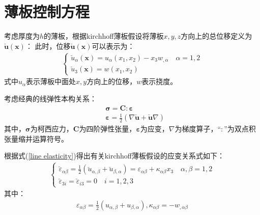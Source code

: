 \documentclass[engineeringmaster]{hquThesis}
\begin{document}
\section{薄板控制方程}
考虑厚度为$h$的薄板，根据kirchhoff薄板假设将薄板$x,y,z$方向上的总位移定义为$\breve{\pmb{u}}(\pmb{x})$：
此时，位移$\breve{\pmb{u}}(\pmb{x})$可以表示为：
\begin{equation}
    \begin{split}
    \begin{cases}
        \breve{u}_{\alpha}(\pmb{x})=u_{\alpha}(x_1,x_2)-x_3w_{,\alpha}\quad \alpha=1,2\\
        \breve{u}_3(\pmb{x})=w(x_1,x_2)
    \end{cases}
    \end{split}
    \end{equation}
式中$u_{\alpha}$表示薄板中面处$x,y$方向上的位移，$w$表示挠度。\par
考虑经典的线弹性本构关系：
\begin{equation}\label{line elasticity}
\begin{split}
    &\pmb{\sigma}=\pmb{C}\pmb{:}\pmb{\varepsilon}\\
    &\pmb{\varepsilon}=\frac{1}{2}(\nabla\breve{\pmb{u}}+\breve{\pmb{u}}\nabla)
\end{split}
\end{equation}
其中，$\pmb{\sigma}$为柯西应力，$\pmb{C}$为四阶弹性张量，$\pmb{\varepsilon}$为应变，$\nabla$为梯度算子，$“\pmb{:}”$为双点积张量缩并运算符号。\par
根据式(\ref{line elasticity})得出有关kirchhoff薄板假设的应变关系式如下：
\begin{equation}\label{strain}
\begin{split}
\begin{cases}
    \breve{\varepsilon}_{\alpha\beta}=\frac{1}{2}(\breve{u}_{\alpha,\beta}+\breve{u}_{\beta,\alpha})=\varepsilon_{\alpha\beta}+\kappa_{\alpha\beta}x_3 \quad \alpha,\beta=1,2\\
    \breve{\varepsilon}_{3i}=\breve{\varepsilon}_{i3}=0 \quad i=1,2,3
\end{cases}
\end{split}
\end{equation}
其中：
\begin{equation}
\begin{split}
    \varepsilon_{\alpha\beta}=\frac{1}{2}(u_{\alpha,\beta}+u_{\beta,\alpha}),\kappa_{\alpha\beta}=-w_{,\alpha\beta}
\end{split}
\end{equation}
\end{document}
